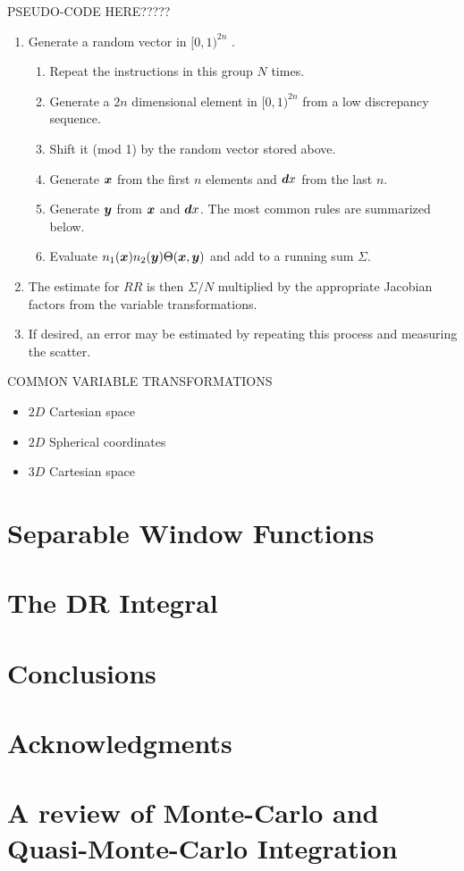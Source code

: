 \documentclass[usenatbib]{mn2e}
\begin{document}
PSEUDO-CODE HERE?????
\begin{enumerate}
  \item Generate a random vector in $[0,1)^{2n}$ .
  \begin{enumerate}
    \item Repeat the instructions in this group $N$ times.
    \item Generate a $2n$ dimensional element in $[0,1)^{2n}$ from a low
    discrepancy sequence.
    \item Shift it (mod 1) by the random vector stored above.
    \item Generate ${\bm x}$ from the first $n$ elements and ${\bm dx}$ from the last
    $n$.
    \item Generate ${\bm y}$ from ${\bm x}$ and ${\bm dx}$. The most common rules are
    summarized below.
    \item Evaluate $n_1({\bm x}) n_2({\bm y}) \Theta({\bm x}, {\bm y})$ and add to a running sum
    $\Sigma$.
  \end{enumerate}
  \item The estimate for $RR$ is then $\Sigma/N$ multiplied by the appropriate
  Jacobian factors from the variable transformations. 
  \item If desired, an error may be estimated by repeating this process and
  measuring the scatter. 
\end{enumerate}

COMMON VARIABLE TRANSFORMATIONS
\begin{itemize}
  \item $2D$ Cartesian space
  \item $2D$ Spherical coordinates
  \item $3D$ Cartesian space
\end{itemize}


\section{Separable Window Functions}
\label{sec:sep}

\section{The DR Integral}
\label{sec:DR}

\section{Conclusions}
\label{sec:conclude}


\section{Acknowledgments}

\appendix

\section{A review of Monte-Carlo and Quasi-Monte-Carlo Integration}
\label{sec:review}
\end{document}
